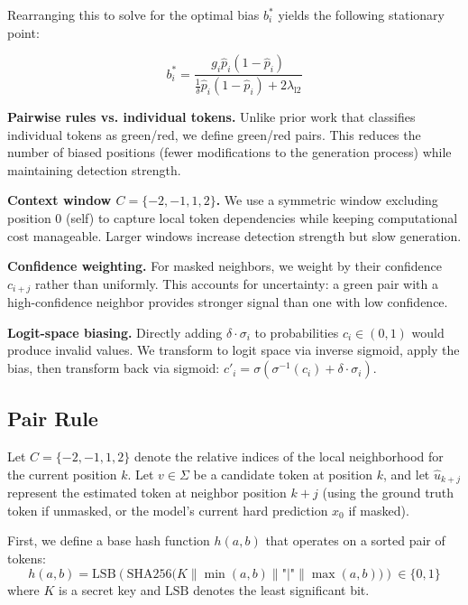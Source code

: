 Rearranging this to solve for the optimal bias $b_i^*$ yields the following stationary point:

\begin{equation}
b_i^* = \frac{g_i \hat{p}_i(1-\hat{p}_i)}{\frac{1}{\delta} \hat{p}_i(1-\hat{p}_i) + 2\lambda_{\text{l2}}}
\end{equation}


\textbf{Pairwise rules vs. individual tokens.} Unlike prior work that classifies individual tokens as green/red, we define green/red pairs. This reduces the number of biased positions (fewer modifications to the generation process) while maintaining detection strength.

\textbf{Context window $C = \{-2, -1, 1, 2\}$.} We use a symmetric window excluding position 0 (self) to capture local token dependencies while keeping computational cost manageable. Larger windows increase detection strength but slow generation.

\textbf{Confidence weighting.} For masked neighbors, we weight by their confidence $c_{i+j}$ rather than uniformly. This accounts for uncertainty: a green pair with a high-confidence neighbor provides stronger signal than one with low confidence.

\textbf{Logit-space biasing.} Directly adding $\delta \cdot \sigma_i$ to probabilities $c_i \in (0,1)$ would produce invalid values. We transform to logit space via inverse sigmoid, apply the bias, then transform back via sigmoid: $c'_i = \sigma(\sigma^{-1}(c_i) + \delta \cdot \sigma_i)$.
\subsection{Pair Rule}
Let $C = \{-2, -1, 1, 2\}$ denote the relative indices of the local neighborhood for the current position $k$. Let $v \in \Sigma$ be a candidate token at position $k$, and let $\hat{u}_{k+j}$ represent the estimated token at neighbor position $k+j$ (using the ground truth token if unmasked, or the model's current hard prediction $x_0$ if masked).

First, we define a base hash function $h(a, b)$ that operates on a sorted pair of tokens:
\begin{equation}
    h(a, b) = \text{LSB}\left(\text{SHA256}\bigl(K \parallel \min(a, b) \parallel \text{"|"} \parallel \max(a, b)\bigr)\right) \in \{0, 1\}
\end{equation}
where $K$ is a secret key and $\text{LSB}$ denotes the least significant bit.


